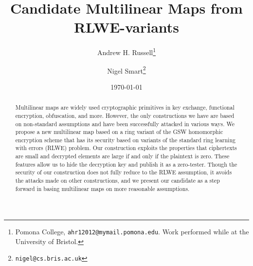 \documentclass[11pt]{article}
\title{Candidate Multilinear Maps from RLWE-variants}
\author{Andrew H. Russell\thanks{Pomona College, \texttt{ahr12012@mymail.pomona.edu}.  Work performed while at the University of Bristol.} \and Nigel Smart\thanks{\texttt{nigel@cs.bris.ac.uk}}}
\date{\today}
\begin{document}
\maketitle
\begin{abstract}
Multilinear maps are widely used cryptographic primitives in key exchange, functional encryption, obfuscation, and more.  However, the only constructions we have are based on non-standard assumptions and have been successfully attacked in various ways.  We propose a new multilinear map based on a ring variant of the GSW homomorphic encryption scheme that has its security based on variants of the standard ring learning with errors (RLWE) problem.  Our construction exploits the properties that ciphertexts are small and decrypted elements are large if and only if the plaintext is zero.  These features allow us to hide the decryption key and publish it as a zero-tester. Though the security of our construction does not fully reduce to the RLWE assumption, it avoids the attacks made on other constructions, and we present our candidate as a step forward in basing multilinear maps on more reasonable assumptions. 
\end{abstract}







\newpage

%
%




\end{document}
